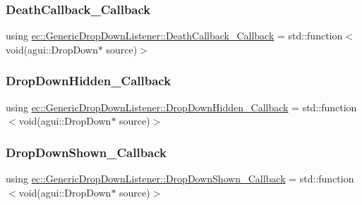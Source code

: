 \subsubsection{\texorpdfstring{Death\+Callback\+\_\+\+Callback}{DeathCallback\_Callback}}
{\footnotesize\ttfamily using \mbox{\hyperlink{classec_1_1_generic_drop_down_listener_a72a84eeb2fdcc0eae78b78c53a59db3b}{ec\+::\+Generic\+Drop\+Down\+Listener\+::\+Death\+Callback\+\_\+\+Callback}} =  std\+::function$<$void(agui\+::\+Drop\+Down$\ast$ source)$>$}

\mbox{\label{classec_1_1_generic_drop_down_listener_ae0548e780805b39f5817e6659932b478}} 
\subsubsection{\texorpdfstring{Drop\+Down\+Hidden\+\_\+\+Callback}{DropDownHidden\_Callback}}
{\footnotesize\ttfamily using \mbox{\hyperlink{classec_1_1_generic_drop_down_listener_ae0548e780805b39f5817e6659932b478}{ec\+::\+Generic\+Drop\+Down\+Listener\+::\+Drop\+Down\+Hidden\+\_\+\+Callback}} =  std\+::function$<$void(agui\+::\+Drop\+Down$\ast$ source)$>$}

\mbox{\label{classec_1_1_generic_drop_down_listener_ac5e0a45750cc64cb003f20d438047ddd}} 
\subsubsection{\texorpdfstring{Drop\+Down\+Shown\+\_\+\+Callback}{DropDownShown\_Callback}}
{\footnotesize\ttfamily using \mbox{\hyperlink{classec_1_1_generic_drop_down_listener_ac5e0a45750cc64cb003f20d438047ddd}{ec\+::\+Generic\+Drop\+Down\+Listener\+::\+Drop\+Down\+Shown\+\_\+\+Callback}} =  std\+::function$<$void(agui\+::\+Drop\+Down$\ast$ source)$>$}

